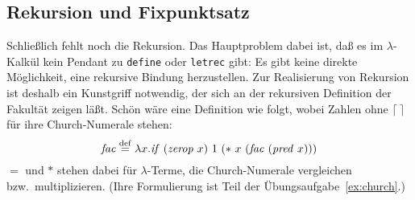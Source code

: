 \subsection{Rekursion und Fixpunktsatz}
\label{sec:fixpunktsatz}
%
Schließlich fehlt noch die Rekursion.  Das Hauptproblem dabei ist, daß
es im $\lambda$-Kalkül kein Pendant zu \texttt{define} oder
\texttt{letrec} gibt: Es gibt keine direkte Möglichkeit, eine
rekursive Bindung herzustellen.  Zur Realisierung von Rekursion ist
deshalb ein Kunstgriff notwendig, der sich an der rekursiven
Definition der Fakultät zeigen läßt.
Schön wäre eine Definition wie folgt, wobei Zahlen ohne $\lceil\:\rceil$ für
ihre Church-Numerale stehen:
%
\begin{displaymath}
  \mathit{fac} \stackrel{\rm def}{=}{} \lambda x.\mathit{if}~(\mathit{zerop}~x)~1~(\ast~x~(\mathit{fac}~(\mathit{pred}~x)))
\end{displaymath}
%
$=$ und $\ast$ stehen dabei für $\lambda$-Terme, die Church-Numerale
vergleichen bzw.\ multiplizieren.  (Ihre Formulierung ist Teil der
Übungsaufgabe~\ref{ex:church}.)

